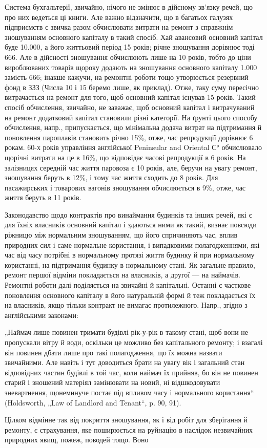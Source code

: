 Система бухгальтерії, звичайно, нічого не змінює в дійсному зв’язку речей, що про них ведеться ці
книги. Але важно відзначити, що в багатьох
галузях підприємств є звичка разом обчислювати витрати на ремонт з справжнім зношуванням
основного капіталу в такий спосіб. Хай авансовий основний капітал буде \num{10.000}, а його
життьовий період 15 років; річне зношування дорівнює тоді 666. Але в дійсності
зношування обчислюють лише на 10 років, тобто до ціни вироблюваних товарів щороку додають на
зношування основного капіталу \num{1.000} замість 666; інакше кажучи, на ремонтні
роботи тощо утворюється резервний фонд в ЗЗЗ  (Числа 10 і 15 беремо лише, як приклад).
Отже, таку суму пересічно витрачається на ремонт для того, щоб основний капітал існував 15 років.
Такий спосіб обчислення, звичайно, не заважає, щоб основний капітал і витрачуваний на ремонт
додатковий капітал становили різні категорії. На ґрунті цього способу обчислення, напр.,
припускається, що мінімальна додача витрат на підтримання й поновлення пароплавів становить річно
15\%, отже, час репродукції дорівнює 6 рокам. 60-х років управління англійської Peninsular and
Oriental С° обчислювало щорічні витрати на це в 16\%, що відповідає часові репродукції в 6 років.
На залізницях середній час життя паровоза є 10 років, але, беручи на увагу ремонт, зношування беруть
в 12\%, і тому час життя сходить до 8 років. Для пасажирських і товарових вагонів зношування
обчислюється в 9\%, отже, час життя беруть в 11 років.

Законодавство щодо контрактів про винаймання будинків та інших речей, які є для їхніх власників
основний капітал і здаються ними як такий, визнає повсюди ріжницю між нормальним зношуванням, що
його спричиняють час, вплив природних сил і саме нормальне користання, і випадковими полагодженнями,
які час від часу потрібні в нормальному протязі життя будинку й при нормальному користанні, на
підтримання будинку в нормальному стані. Як загальне правило, ремонт першої відміни покладається на
власників, а другої — на наймачів. Ремонтні роботи далі поділяється на звичайні й капітальні.
Останні є часткове поновлення основного капіталу в його натуральній формі й теж покладається їх на
власників, якщо тільки контракт не вимагає протилежного. Напр., згідно з англійськими законами:

„Наймач лише повинен тримати будівлі рік-у-рік в такому стані, щоб вони не пропускали вітру й води,
оскільки це можливо без капітального ремонту; і взагалі він повинен дбати лише про такі
полагодження, що їх можна назвати звичайними. Але навіть і тут доводиться брати на увагу вік і
загальний стан відповідних частин будівлі в той час, коли наймач їх прийняв, бо він не повинен
старий і зношений матеріял замінювати на новий, ні відшкодовувати зневартнення, щонеминуче постає
під впливом часу і нормального користання“ (Holdsworth, „Law of Landlord and Tenant“, p. 90, 91).

Цілком відмінне так від покриття зношування, як і від робіт для зберігання й ремонту, є страхування,
яке поширюється на руйнацію в наслідок незвичайних природних явищ, пожеж, поводей тощо. Воно
\parbreak{}  %
